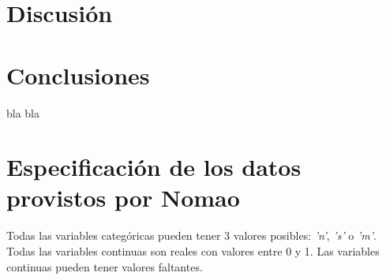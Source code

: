 \documentclass[journal]{IEEEtran}
\begin{document}
\section{Discusión}

\section{Conclusiones}

bla bla



\appendices

\section{Especificación de los datos provistos por Nomao}
\label{appendix1}
Todas las variables categóricas pueden tener 3 valores posibles:
\textit{'n'}, \textit{'s'} o \textit{'m'}.
Todas las variables continuas son reales con valores entre 
0 y 1. Las variables continuas pueden tener valores faltantes.
\end{document}
